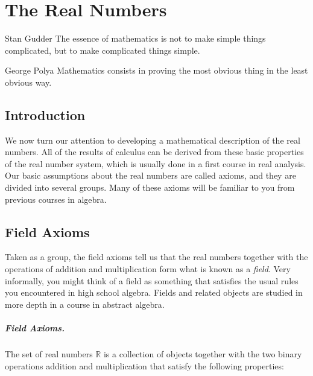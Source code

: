 \chapter{The Real Numbers}

\begin{chapqt}{Stan Gudder}
The essence of mathematics is not to make simple things complicated, but to make complicated things simple.
\end{chapqt}

\begin{chapqt}{George Polya}
Mathematics consists in proving the most obvious thing in the least obvious way.
\end{chapqt}

\section*{Introduction}

We now turn our attention to developing a mathematical description of the real numbers. All of the results of calculus can be derived from these basic properties of the real number system, which is usually done in a first course in real analysis. Our basic assumptions about the real numbers are called axioms, and they are divided into several groups. Many of these axioms will be familiar to you from previous courses in algebra.

\section{Field Axioms}

Taken as a group, the field axioms tell us that the real numbers together with the operations of addition and multiplication form what is known as a {\sl field}. Very informally, you might think of a field as something that satisfies the usual rules you encountered in high school algebra. Fields and related objects are studied in more depth in a course in abstract algebra.

\paragraph{Field Axioms.} The set of real numbers $\mathbb R$ is a collection of objects together with the two binary operations addition and multiplication that satisfy the following properties:

